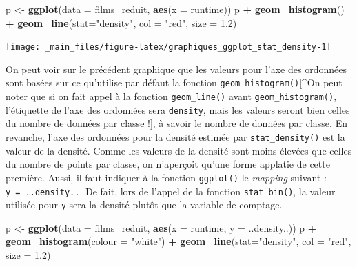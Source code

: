 \documentclass[
  11pt,
]{book}
\newenvironment{Shaded}{\begin{snugshade}}{\end{snugshade}}
\newcommand{\DataTypeTok}[1]{\textcolor[rgb]{0.13,0.29,0.53}{#1}}
\newcommand{\FloatTok}[1]{\textcolor[rgb]{0.00,0.00,0.81}{#1}}
\newcommand{\KeywordTok}[1]{\textcolor[rgb]{0.13,0.29,0.53}{\textbf{#1}}}
\newcommand{\NormalTok}[1]{#1}
\newcommand{\OperatorTok}[1]{\textcolor[rgb]{0.81,0.36,0.00}{\textbf{#1}}}
\newcommand{\StringTok}[1]{\textcolor[rgb]{0.31,0.60,0.02}{#1}}
\numberwithin{equation}{section}
\numberwithin{countremarque}{section}
\begin{document}
\begin{Shaded}
\begin{Highlighting}[]
\NormalTok{p \textless{}{-}}\StringTok{ }\KeywordTok{ggplot}\NormalTok{(}\DataTypeTok{data =}\NormalTok{ films\_reduit, }\KeywordTok{aes}\NormalTok{(}\DataTypeTok{x =}\NormalTok{ runtime))}
\NormalTok{p }\OperatorTok{+}\StringTok{ }\KeywordTok{geom\_histogram}\NormalTok{() }\OperatorTok{+}\StringTok{ }
\StringTok{  }\KeywordTok{geom\_line}\NormalTok{(}\DataTypeTok{stat=}\StringTok{"density"}\NormalTok{, }\DataTypeTok{col =} \StringTok{"red"}\NormalTok{, }\DataTypeTok{size =} \FloatTok{1.2}\NormalTok{)}
\end{Highlighting}
\end{Shaded}

\begin{center}\texttt{[image: \_main\_files/figure-latex/graphiques\_ggplot\_stat\_density-1]} \end{center}

On peut voir sur le précédent graphique que les valeurs pour l'axe des ordonnées sont basées sur ce qu'utilise par défaut la fonction \texttt{geom\_histogram()}{[}\^{}On peut noter que si on fait appel à la fonction \texttt{geom\_line()} avant \texttt{geom\_histogram()}, l'étiquette de l'axe des ordonnées sera \texttt{density}, mais les valeurs seront bien celles du nombre de données par classe !{]}, à savoir le nombre de données par classe. En revanche, l'axe des ordonnées pour la densité estimée par \texttt{stat\_density()} est la valeur de la densité. Comme les valeurs de la densité sont moins élevées que celles du nombre de points par classe, on n'aperçoit qu'une forme applatie de cette première. Aussi, il faut indiquer à la fonction \texttt{ggplot()} le \emph{mapping} suivant : \texttt{y\ =\ ..density..}. De fait, lors de l'appel de la fonction \texttt{stat\_bin()}, la valeur utilisée pour \texttt{y} sera la densité plutôt que la variable de comptage.

\begin{Shaded}
\begin{Highlighting}[]
\NormalTok{p \textless{}{-}}\StringTok{ }\KeywordTok{ggplot}\NormalTok{(}\DataTypeTok{data =}\NormalTok{ films\_reduit, }\KeywordTok{aes}\NormalTok{(}\DataTypeTok{x =}\NormalTok{ runtime, }\DataTypeTok{y =}\NormalTok{ ..density..))}
\NormalTok{p }\OperatorTok{+}\StringTok{ }\KeywordTok{geom\_histogram}\NormalTok{(}\DataTypeTok{colour =} \StringTok{"white"}\NormalTok{) }\OperatorTok{+}
\StringTok{  }\KeywordTok{geom\_line}\NormalTok{(}\DataTypeTok{stat=}\StringTok{"density"}\NormalTok{, }\DataTypeTok{col =} \StringTok{"red"}\NormalTok{, }\DataTypeTok{size =} \FloatTok{1.2}\NormalTok{)  }
\end{Highlighting}
\end{Shaded}
\end{document}
